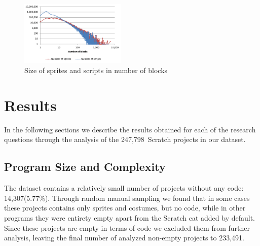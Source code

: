 \documentclass{sig-alternate}
\newcommand{\nAnalyzedPrograms}{247,798}
\newcommand{\nemptyPrograms}{14,307}
\newcommand{\nScriptPrograms}{233,491}
\begin{document}
\begin{figure}
	\centering
	\includegraphics[width=0.45\textwidth]{fig/charts/13longmethod}
	\caption{Size of sprites and scripts in number of blocks}
	\label{fig:longmethod}
\end{figure}

\section{Results}
\label{sec:results}
In the following sections we describe the results obtained for each of the research questions through the analysis of the \nAnalyzedPrograms~Scratch projects in our dataset.

\subsection{Program Size and Complexity}
\label{RQ1}
The dataset contains a relatively small number of projects without any code: \nemptyPrograms (5.77\%). Through random manual sampling we found that in some cases these projects contains only sprites and costumes, but no code, while in other programs they were entirety empty apart from the Scratch cat added by default. Since these projects are empty in terms of code we excluded them from further analysis, leaving the final number of analyzed non-empty projects to \nScriptPrograms.
\end{document}
